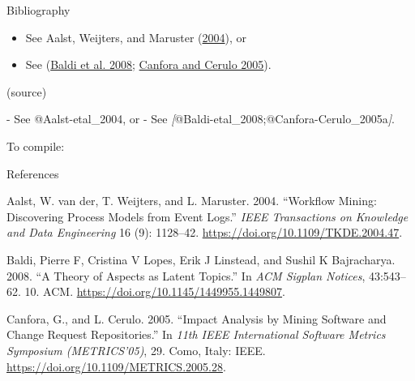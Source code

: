 \documentclass[
  10pt,
  ignorenonframetext,
  serif,onlymath]{beamer}
\newenvironment{Shaded}{}{}
\newcommand{\AttributeTok}[1]{\textcolor[rgb]{0.49,0.56,0.16}{#1}}
\newcommand{\CommentTok}[1]{\textcolor[rgb]{0.38,0.63,0.69}{\textit{#1}}}
\newcommand{\DataTypeTok}[1]{\textcolor[rgb]{0.56,0.13,0.00}{#1}}
\newcommand{\ExtensionTok}[1]{#1}
\newcommand{\NormalTok}[1]{#1}
\newcommand{\OtherTok}[1]{\textcolor[rgb]{0.00,0.44,0.13}{#1}}
\newcommand{\SpecialStringTok}[1]{\textcolor[rgb]{0.73,0.40,0.53}{#1}}
\providecommand{\tightlist}{%
  \setlength{\itemsep}{0pt}\setlength{\parskip}{0pt}}
\newlength{\cslhangindent}
\newlength{\cslentryspacingunit} %
\newenvironment{CSLReferences}[2] %
 {%
  \setlength{\parindent}{0pt}
  \ifodd #1
  \let\oldpar\par
  \def\par{\hangindent=\cslhangindent\oldpar}
  \fi
  \setlength{\parskip}{#2\cslentryspacingunit}
 }%
 {}
\begin{document}
\begin{frame}[fragile]{Bibliography}
\protect\hypertarget{sec:bibliography}{}
\begin{itemize}
\tightlist
\item
  See Aalst, Weijters, and Maruster
  (\protect\hyperlink{ref-Aalst-etal_2004}{2004}), or
\item
  See (\protect\hyperlink{ref-Baldi-etal_2008}{Baldi et al. 2008};
  \protect\hyperlink{ref-Canfora-Cerulo_2005a}{Canfora and Cerulo
  2005}).
\end{itemize}

(source)

\begin{Shaded}
\begin{Highlighting}[]
\SpecialStringTok{{-} }\NormalTok{See @Aalst{-}etal\_2004, or}
\SpecialStringTok{{-} }\NormalTok{See }\CommentTok{[}\OtherTok{@Baldi{-}etal\_2008;@Canfora{-}Cerulo\_2005a}\CommentTok{]}\NormalTok{.}
\end{Highlighting}
\end{Shaded}

To compile:

\begin{Shaded}
\end{Shaded}
\end{frame}

\begin{frame}[allowframebreaks]{References}
\protect\hypertarget{sec:references}{}
\hypertarget{refs}{}
\begin{CSLReferences}{1}{0}
\leavevmode{}%
Aalst, W. van der, T. Weijters, and L. Maruster. 2004. {``Workflow
Mining: Discovering Process Models from Event Logs.''} \emph{IEEE
Transactions on Knowledge and Data Engineering} 16 (9): 1128--42.
\url{https://doi.org/10.1109/TKDE.2004.47}.

\leavevmode{}%
Baldi, Pierre F, Cristina V Lopes, Erik J Linstead, and Sushil K
Bajracharya. 2008. {``A Theory of Aspects as Latent Topics.''} In
\emph{ACM Sigplan Notices}, 43:543--62. 10. ACM.
\url{https://doi.org/10.1145/1449955.1449807}.

\leavevmode{}%
Canfora, G., and L. Cerulo. 2005. {``Impact Analysis by Mining Software
and Change Request Repositories.''} In \emph{11th IEEE International
Software Metrics Symposium (METRICS'05)}, 29. Como, Italy: IEEE.
\url{https://doi.org/10.1109/METRICS.2005.28}.

\end{CSLReferences}
\end{frame}
\end{document}
